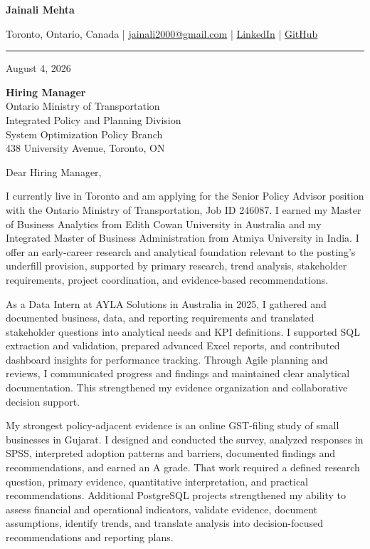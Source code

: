 \documentclass[letterpaper,10pt]{article}
\begin{document}
\begin{center}
  {\fontsize{17}{19}\selectfont\textbf{Jainali Mehta}}\par\vspace{2pt}
  \small Toronto, Ontario, Canada \;|\;
  \href{mailto:jainali2000@gmail.com}{jainali2000@gmail.com} \;|\;
  \href{https://www.linkedin.com/in/jainali-mehta}{LinkedIn} \;|\;
  \href{https://github.com/jainalimehta}{GitHub}
\end{center}
\vspace{-5pt}
\noindent\rule{\textwidth}{0.4pt}

August 4, 2026

\textbf{Hiring Manager}\\
Ontario Ministry of Transportation\\
Integrated Policy and Planning Division\\
System Optimization Policy Branch\\
438 University Avenue, Toronto, ON

Dear Hiring Manager,

I currently live in Toronto and am applying for the Senior Policy Advisor position with the Ontario Ministry of Transportation, Job ID 246087. I earned my Master of Business Analytics from Edith Cowan University in Australia and my Integrated Master of Business Administration from Atmiya University in India. I offer an early-career research and analytical foundation relevant to the posting's underfill provision, supported by primary research, trend analysis, stakeholder requirements, project coordination, and evidence-based recommendations.

As a Data Intern at AYLA Solutions in Australia in 2025, I gathered and documented business, data, and reporting requirements and translated stakeholder questions into analytical needs and KPI definitions. I supported SQL extraction and validation, prepared advanced Excel reports, and contributed dashboard insights for performance tracking. Through Agile planning and reviews, I communicated progress and findings and maintained clear analytical documentation. This strengthened my evidence organization and collaborative decision support.

My strongest policy-adjacent evidence is an online GST-filing study of small businesses in Gujarat. I designed and conducted the survey, analyzed responses in SPSS, interpreted adoption patterns and barriers, documented findings and recommendations, and earned an A grade. That work required a defined research question, primary evidence, quantitative interpretation, and practical recommendations. Additional PostgreSQL projects strengthened my ability to assess financial and operational indicators, validate evidence, document assumptions, identify trends, and translate analysis into decision-focused recommendations and reporting plans.
\end{document}
